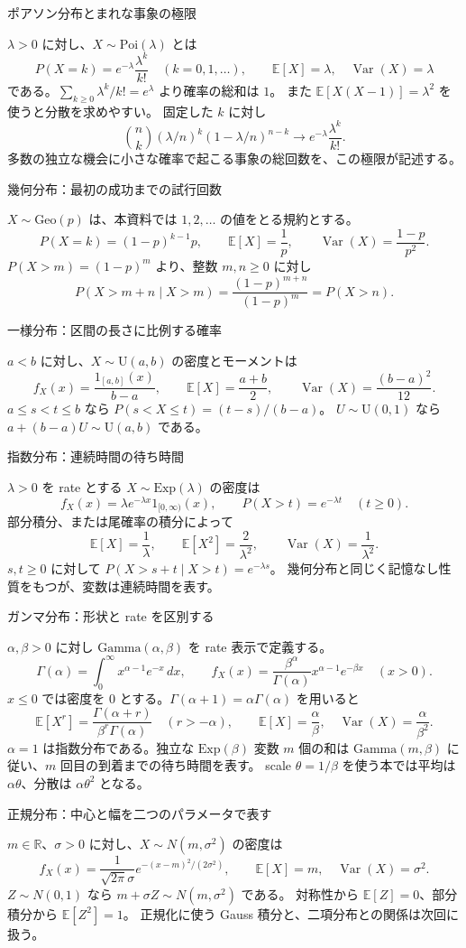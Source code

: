 \documentclass[a4paper,10pt,pdflatex,ja=standard,jafont=ipaex-type1,
  magstyle=real,scale=1]{bxjsarticle}
\newcommand{\topic}[1]{\par\vspace{5pt}
  {\large\sffamily\mdseries\color{accent}#1}\par\vspace{2pt}}
\newcommand{\R}{\mathbb R}
\newcommand{\E}{\mathbb E}
\newcommand{\Var}{\operatorname{Var}}
\newcommand{\ind}{\mathrm{1}}
\begin{document}
\topic{ポアソン分布とまれな事象の極限}
$\lambda>0$ に対し、$X\sim\mathrm{Poi}(\lambda)$ とは
$$
  P(X=k)=e^{-\lambda}\frac{\lambda^k}{k!}\quad(k=0,1,\ldots),
  \qquad \E[X]=\lambda,\quad\Var(X)=\lambda
$$
である。$\sum_{k\ge0}\lambda^k/k!=e^\lambda$ より確率の総和は $1$。
また $\E[X(X-1)]=\lambda^2$ を使うと分散を求めやすい。
固定した $k$ に対し
$$\binom nk(\lambda/n)^k(1-\lambda/n)^{n-k}
  \longrightarrow e^{-\lambda}\frac{\lambda^k}{k!}.$$
多数の独立な機会に小さな確率で起こる事象の総回数を、この極限が記述する。

\topic{幾何分布：最初の成功までの試行回数}
$X\sim\mathrm{Geo}(p)$ は、本資料では $1,2,\ldots$ の値をとる規約とする。
$$P(X=k)=(1-p)^{k-1}p,\qquad \E[X]=\frac1p,\qquad
  \Var(X)=\frac{1-p}{p^2}.$$
$P(X>m)=(1-p)^m$ より、整数 $m,n\ge0$ に対し
$$P(X>m+n\mid X>m)=\frac{(1-p)^{m+n}}{(1-p)^m}=P(X>n).$$

\newpage
\topic{一様分布：区間の長さに比例する確率}
$a<b$ に対し、$X\sim\mathrm U(a,b)$ の密度とモーメントは
$$
 f_X(x)=\frac{\ind_{[a,b]}(x)}{b-a},\qquad
 \E[X]=\frac{a+b}{2},\qquad \Var(X)=\frac{(b-a)^2}{12}.
$$
$a\le s<t\le b$ なら $P(s<X\le t)=(t-s)/(b-a)$。
$U\sim\mathrm U(0,1)$ なら $a+(b-a)U\sim\mathrm U(a,b)$ である。

\topic{指数分布：連続時間の待ち時間}
$\lambda>0$ を rate とする $X\sim\mathrm{Exp}(\lambda)$ の密度は
$$f_X(x)=\lambda e^{-\lambda x}\ind_{[0,\infty)}(x),\qquad
  P(X>t)=e^{-\lambda t}\quad(t\ge0).$$
部分積分、または尾確率の積分によって
$$\E[X]=\frac1\lambda,\qquad \E[X^2]=\frac2{\lambda^2},\qquad
  \Var(X)=\frac1{\lambda^2}.$$
$s,t\ge0$ に対して $P(X>s+t\mid X>t)=e^{-\lambda s}$。
幾何分布と同じく記憶なし性質をもつが、変数は連続時間を表す。

\topic{ガンマ分布：形状と rate を区別する}
$\alpha,\beta>0$ に対し $\mathrm{Gamma}(\alpha,\beta)$ を rate 表示で定義する。
$$
 \Gamma(\alpha)=\int_0^\infty x^{\alpha-1}e^{-x}\,dx,\qquad
 f_X(x)=\frac{\beta^\alpha}{\Gamma(\alpha)}x^{\alpha-1}e^{-\beta x}
 \quad(x>0).
$$
$x\le0$ では密度を $0$ とする。$\Gamma(\alpha+1)=\alpha\Gamma(\alpha)$ を用いると
$$\E[X^r]=\frac{\Gamma(\alpha+r)}{\beta^r\Gamma(\alpha)}\quad(r> -\alpha),
 \qquad \E[X]=\frac\alpha\beta,\quad\Var(X)=\frac\alpha{\beta^2}.$$
$\alpha=1$ は指数分布である。独立な $\mathrm{Exp}(\beta)$ 変数 $m$ 個の和は
$\mathrm{Gamma}(m,\beta)$ に従い、$m$ 回目の到着までの待ち時間を表す。
scale $\theta=1/\beta$ を使う本では平均は $\alpha\theta$、分散は $\alpha\theta^2$ となる。

\topic{正規分布：中心と幅を二つのパラメータで表す}
$m\in\R$、$\sigma>0$ に対し、$X\sim N(m,\sigma^2)$ の密度は
$$f_X(x)=\frac1{\sqrt{2\pi}\sigma}
 e^{-(x-m)^2/(2\sigma^2)},\qquad \E[X]=m,\quad\Var(X)=\sigma^2.$$
$Z\sim N(0,1)$ なら $m+\sigma Z\sim N(m,\sigma^2)$ である。
対称性から $\E[Z]=0$、部分積分から $\E[Z^2]=1$。
正規化に使う Gauss 積分と、二項分布との関係は次回に扱う。
\end{document}
